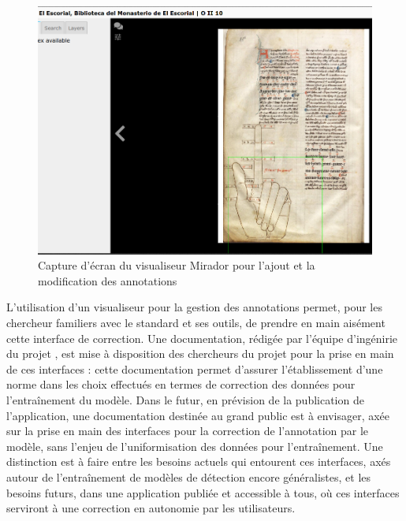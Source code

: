   	\begin{figure}[h]
		\centering
		\includegraphics[width=14cm]{images/eida_add_anno.png}
		\caption{Capture d'écran du visualiseur Mirador \eida pour l'ajout et la modification des annotations}
		\label{fig:eida_add_anno}
	\end{figure}

	L'utilisation d'un visualiseur \iiif pour la gestion des annotations permet, pour les chercheur familiers avec le standard et ses outils, de prendre en main aisément cette interface de correction. Une documentation, rédigée par l'équipe d'ingénirie du projet \eida, est mise à disposition des chercheurs du projet pour la prise en main de ces interfaces : cette documentation permet d'assurer l'établissement d'une norme dans les choix effectués en termes de correction des données pour l'entraînement du modèle. Dans le futur, en prévision de la publication de l'application, une documentation destinée au grand public est à envisager, axée sur la prise en main des interfaces pour la correction de l'annotation par le modèle, sans l'enjeu de l'uniformisation des données pour l'entraînement. Une distinction est à faire entre les besoins actuels qui entourent ces interfaces, axés autour de l'entraînement de modèles de détection encore généralistes, et les besoins futurs, dans une application publiée et accessible à tous, où ces interfaces serviront à une correction en autonomie par les utilisateurs.
